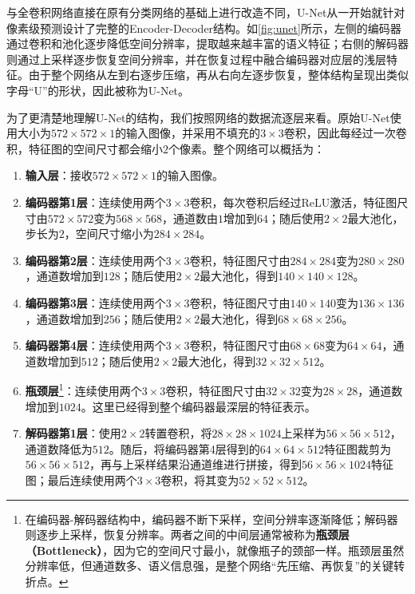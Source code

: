 与全卷积网络直接在原有分类网络的基础上进行改造不同，U-Net从一开始就针对像素级预测设计了完整的Encoder-Decoder结构。如\cref{fig:unet}所示，左侧的编码器通过卷积和池化逐步降低空间分辨率，提取越来越丰富的语义特征；右侧的解码器则通过上采样逐步恢复空间分辨率，并在恢复过程中融合编码器对应层的浅层特征。由于整个网络从左到右逐步压缩，再从右向左逐步恢复，整体结构呈现出类似字母“U”的形状，因此被称为U-Net。

为了更清楚地理解U-Net的结构，我们按照网络的数据流逐层来看。原始U-Net使用大小为$572\times572\times1$的输入图像，并采用不填充的$3\times3$卷积，因此每经过一次卷积，特征图的空间尺寸都会缩小$2$个像素。整个网络可以概括为：

\begin{enumerate}
    \item \textbf{输入层}：接收$572\times572\times1$的输入图像。
    \item \textbf{编码器第1层}：连续使用两个$3\times3$卷积，每次卷积后经过ReLU激活，特征图尺寸由$572\times572$变为$568\times568$，通道数由$1$增加到$64$；随后使用$2\times2$最大池化，步长为$2$，空间尺寸缩小为$284\times284$。
    \item \textbf{编码器第2层}：连续使用两个$3\times3$卷积，特征图尺寸由$284\times284$变为$280\times280$，通道数增加到$128$；随后使用$2\times2$最大池化，得到$140\times140\times128$。
    \item \textbf{编码器第3层}：连续使用两个$3\times3$卷积，特征图尺寸由$140\times140$变为$136\times136$，通道数增加到$256$；随后使用$2\times2$最大池化，得到$68\times68\times256$。
    \item \textbf{编码器第4层}：连续使用两个$3\times3$卷积，特征图尺寸由$68\times68$变为$64\times64$，通道数增加到$512$；随后使用$2\times2$最大池化，得到$32\times32\times512$。
    \item \textbf{瓶颈层}\footnote{在编码器-解码器结构中，编码器不断下采样，空间分辨率逐渐降低；解码器则逐步上采样，恢复分辨率。两者之间的中间层通常被称为\textbf{瓶颈层（Bottleneck）}，因为它的空间尺寸最小，就像瓶子的颈部一样。瓶颈层虽然分辨率低，但通道数多、语义信息强，是整个网络“先压缩、再恢复”的关键转折点。}：连续使用两个$3\times3$卷积，特征图尺寸由$32\times32$变为$28\times28$，通道数增加到$1024$。这里已经得到整个编码器最深层的特征表示。
    \item \textbf{解码器第1层}：使用$2\times2$转置卷积，将$28\times28\times1024$上采样为$56\times56\times512$，通道数降低为$512$。随后，将编码器第4层得到的$64\times64\times512$特征图裁剪为$56\times56\times512$，再与上采样结果沿通道维进行拼接，得到$56\times56\times1024$特征图；最后连续使用两个$3\times3$卷积，将其变为$52\times52\times512$。

\end{enumerate}
